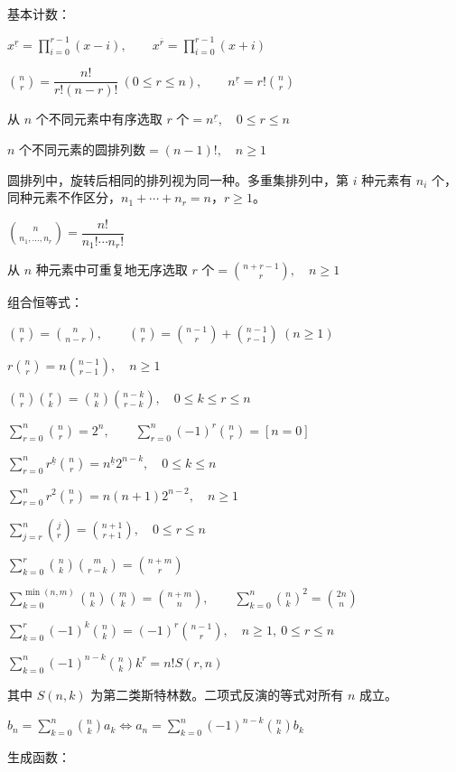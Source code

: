 基本计数：\nopagebreak[4]

$x^{\underline r}=\displaystyle\prod_{i=0}^{r-1}(x-i),\qquad x^{\overline r}=\prod_{i=0}^{r-1}(x+i)$

$\binom nr=\dfrac{n!}{r!(n-r)!}\ (0\le r\le n),\qquad n^{\underline r}=r!\binom nr$

$\text{从 $n$ 个不同元素中有序选取 $r$ 个}=n^{\underline r},\quad 0\le r\le n$

$\text{$n$ 个不同元素的圆排列数}=(n-1)!,\quad n\ge1$

圆排列中，旋转后相同的排列视为同一种。多重集排列中，第 $i$ 种元素有 $n_i$ 个，同种元素不作区分，$n_1+\cdots+n_r=n$，$r\ge1$。

$\binom{n}{n_1,\dots,n_r}=\dfrac{n!}{n_1!\cdots n_r!}$

$\text{从 $n$ 种元素中可重复地无序选取 $r$ 个}=\binom{n+r-1}{r},\quad n\ge1$

组合恒等式：\nopagebreak[4]

$\binom nr=\binom n{n-r},\qquad\binom nr=\binom{n-1}r+\binom{n-1}{r-1}\ (n\ge1)$

$r\binom nr=n\binom{n-1}{r-1},\quad n\ge1$

$\binom nr\binom rk=\binom nk\binom{n-k}{r-k},\quad0\le k\le r\le n$

$\displaystyle\sum_{r=0}^{n}\binom nr=2^n,\qquad\sum_{r=0}^{n}(-1)^r\binom nr=[n=0]$

$\displaystyle\sum_{r=0}^{n}r^{\underline k}\binom nr=n^{\underline k}2^{n-k},\quad0\le k\le n$

$\displaystyle\sum_{r=0}^{n}r^2\binom nr=n(n+1)2^{n-2},\quad n\ge1$

$\displaystyle\sum_{j=r}^{n}\binom jr=\binom{n+1}{r+1},\quad0\le r\le n$

$\displaystyle\sum_{k=0}^{r}\binom nk\binom m{r-k}=\binom{n+m}r$

$\displaystyle\sum_{k=0}^{\min(n,m)}\binom nk\binom mk=\binom{n+m}n,\qquad\sum_{k=0}^{n}\binom nk^2=\binom{2n}n$

$\displaystyle\sum_{k=0}^{r}(-1)^k\binom nk=(-1)^r\binom{n-1}r,\quad n\ge1,\ 0\le r\le n$

$\displaystyle\sum_{k=0}^{n}(-1)^{n-k}\binom nk k^r=n!S(r,n)$

其中 $S(n,k)$ 为第二类斯特林数。二项式反演的等式对所有 $n$ 成立。

$b_n=\displaystyle\sum_{k=0}^{n}\binom nk a_k\iff a_n=\sum_{k=0}^{n}(-1)^{n-k}\binom nk b_k$

生成函数：\nopagebreak[4]

